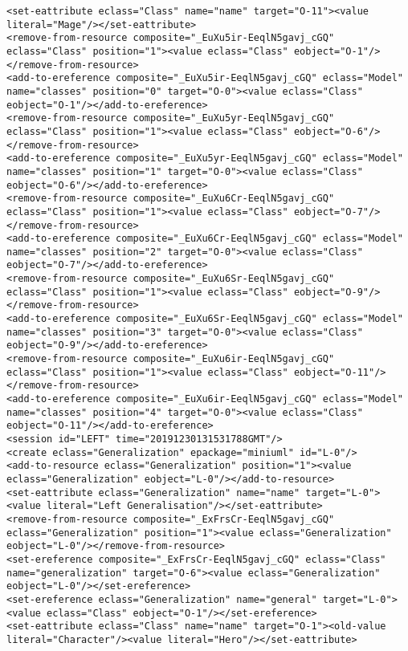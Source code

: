 \begin{lstlisting}[style=cbpfile,caption={Change-based representation of the model in Figure \ref{fig:class_diagram_left}.},label=lst:class_diagram_left_cbpfile]
<set-eattribute eclass="Class" name="name" target="O-11"><value literal="Mage"/></set-eattribute>
<remove-from-resource composite="_EuXu5ir-EeqlN5gavj_cGQ" eclass="Class" position="1"><value eclass="Class" eobject="O-1"/></remove-from-resource>
<add-to-ereference composite="_EuXu5ir-EeqlN5gavj_cGQ" eclass="Model" name="classes" position="0" target="O-0"><value eclass="Class" eobject="O-1"/></add-to-ereference>
<remove-from-resource composite="_EuXu5yr-EeqlN5gavj_cGQ" eclass="Class" position="1"><value eclass="Class" eobject="O-6"/></remove-from-resource>
<add-to-ereference composite="_EuXu5yr-EeqlN5gavj_cGQ" eclass="Model" name="classes" position="1" target="O-0"><value eclass="Class" eobject="O-6"/></add-to-ereference>
<remove-from-resource composite="_EuXu6Cr-EeqlN5gavj_cGQ" eclass="Class" position="1"><value eclass="Class" eobject="O-7"/></remove-from-resource>
<add-to-ereference composite="_EuXu6Cr-EeqlN5gavj_cGQ" eclass="Model" name="classes" position="2" target="O-0"><value eclass="Class" eobject="O-7"/></add-to-ereference>
<remove-from-resource composite="_EuXu6Sr-EeqlN5gavj_cGQ" eclass="Class" position="1"><value eclass="Class" eobject="O-9"/></remove-from-resource>
<add-to-ereference composite="_EuXu6Sr-EeqlN5gavj_cGQ" eclass="Model" name="classes" position="3" target="O-0"><value eclass="Class" eobject="O-9"/></add-to-ereference>
<remove-from-resource composite="_EuXu6ir-EeqlN5gavj_cGQ" eclass="Class" position="1"><value eclass="Class" eobject="O-11"/></remove-from-resource>
<add-to-ereference composite="_EuXu6ir-EeqlN5gavj_cGQ" eclass="Model" name="classes" position="4" target="O-0"><value eclass="Class" eobject="O-11"/></add-to-ereference>
<session id="LEFT" time="20191230131531788GMT"/>
<create eclass="Generalization" epackage="miniuml" id="L-0"/>
<add-to-resource eclass="Generalization" position="1"><value eclass="Generalization" eobject="L-0"/></add-to-resource>
<set-eattribute eclass="Generalization" name="name" target="L-0"><value literal="Left Generalisation"/></set-eattribute>
<remove-from-resource composite="_ExFrsCr-EeqlN5gavj_cGQ" eclass="Generalization" position="1"><value eclass="Generalization" eobject="L-0"/></remove-from-resource>
<set-ereference composite="_ExFrsCr-EeqlN5gavj_cGQ" eclass="Class" name="generalization" target="O-6"><value eclass="Generalization" eobject="L-0"/></set-ereference>
<set-ereference eclass="Generalization" name="general" target="L-0"><value eclass="Class" eobject="O-1"/></set-ereference>
<set-eattribute eclass="Class" name="name" target="O-1"><old-value literal="Character"/><value literal="Hero"/></set-eattribute>

\end{lstlisting}
